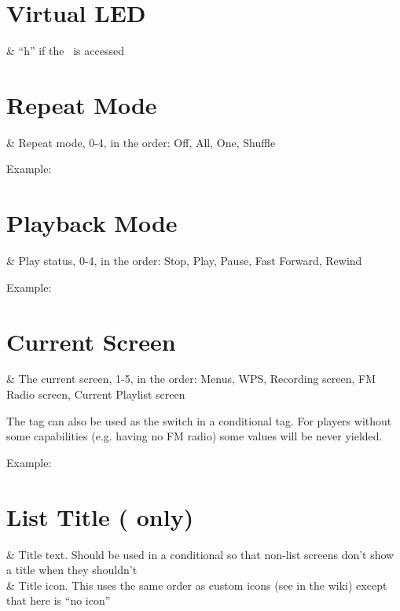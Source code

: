 \section{Virtual LED}
  \begin{tagmap}
     & ``h'' if the \disk\ is accessed\\
  \end{tagmap}

\section{Repeat Mode}
  \begin{tagmap}
     & Repeat mode, 0-4, in the order: Off, All, One, Shuffle
           \\
  \end{tagmap}
Example: 

\section{Playback Mode}
  \begin{tagmap}
     & Play status, 0-4, in the order: Stop, Play, Pause, 
           Fast Forward, Rewind\\
  \end{tagmap}
Example: 

\section{Current Screen}
  \begin{tagmap}
     & The current screen, 1-5, in the order:
                Menus, WPS, Recording screen, FM Radio screen, Current Playlist screen\\
  \end{tagmap}
The tag can also be used as the switch in a conditional tag. For players without
some capabilities (e.g. having no FM radio) some values will be never yielded.

Example: 

\section{List Title ( only)}
  \begin{tagmap}
     & Title text. Should be used in a conditional so that non-list
      screens don't show a title when they shouldn't\\
     & Title icon. This uses the same order as custom icons (see
       in the wiki) except that here  is ``no
      icon''\\
  \end{tagmap}

